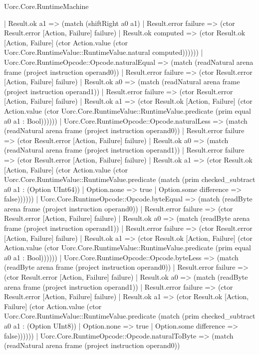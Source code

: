 \begin{lexlean}{Uorc.Core.RuntimeMachine}
\begin{semanticmodule}
{        | Result.ok a1 => (match (shiftRight a0 a1)
          | Result.error failure => (ctor Result.error [Action, Failure] failure)
          | Result.ok computed => (ctor Result.ok [Action, Failure] (ctor Action.value (ctor Uorc.Core.RuntimeValue::RuntimeValue.natural computed))))))
    | Uorc.Core.RuntimeOpcode::Opcode.naturalEqual => (match (readNatural arena frame (project instruction operand0))
      | Result.error failure => (ctor Result.error [Action, Failure] failure)
      | Result.ok a0 => (match (readNatural arena frame (project instruction operand1))
        | Result.error failure => (ctor Result.error [Action, Failure] failure)
        | Result.ok a1 => (ctor Result.ok [Action, Failure] (ctor Action.value (ctor Uorc.Core.RuntimeValue::RuntimeValue.predicate (prim equal a0 a1 : Bool))))))
    | Uorc.Core.RuntimeOpcode::Opcode.naturalLess => (match (readNatural arena frame (project instruction operand0))
      | Result.error failure => (ctor Result.error [Action, Failure] failure)
      | Result.ok a0 => (match (readNatural arena frame (project instruction operand1))
        | Result.error failure => (ctor Result.error [Action, Failure] failure)
        | Result.ok a1 => (ctor Result.ok [Action, Failure] (ctor Action.value (ctor Uorc.Core.RuntimeValue::RuntimeValue.predicate (match (prim checked_subtract a0 a1 : (Option UInt64))
          | Option.none => true
          | Option.some difference => false))))))
    | Uorc.Core.RuntimeOpcode::Opcode.byteEqual => (match (readByte arena frame (project instruction operand0))
      | Result.error failure => (ctor Result.error [Action, Failure] failure)
      | Result.ok a0 => (match (readByte arena frame (project instruction operand1))
        | Result.error failure => (ctor Result.error [Action, Failure] failure)
        | Result.ok a1 => (ctor Result.ok [Action, Failure] (ctor Action.value (ctor Uorc.Core.RuntimeValue::RuntimeValue.predicate (prim equal a0 a1 : Bool))))))
    | Uorc.Core.RuntimeOpcode::Opcode.byteLess => (match (readByte arena frame (project instruction operand0))
      | Result.error failure => (ctor Result.error [Action, Failure] failure)
      | Result.ok a0 => (match (readByte arena frame (project instruction operand1))
        | Result.error failure => (ctor Result.error [Action, Failure] failure)
        | Result.ok a1 => (ctor Result.ok [Action, Failure] (ctor Action.value (ctor Uorc.Core.RuntimeValue::RuntimeValue.predicate (match (prim checked_subtract a0 a1 : (Option UInt8))
          | Option.none => true
          | Option.some difference => false))))))
    | Uorc.Core.RuntimeOpcode::Opcode.naturalToByte => (match (readNatural arena frame (project instruction operand0))
}
\end{semanticmodule}
\end{lexlean}
